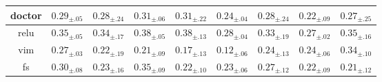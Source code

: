 \begin{table}
{\begin{tabular}{c|c|c|c|c|c|c|c|c|c}
		\multicolumn{2}{c|}{\gls{doctor}} & $0.29_{\pm .05}$ & $0.28_{\pm .24}$ & $0.31_{\pm .06}$ & $0.31_{\pm .22}$ & $0.24_{\pm .04}$ & $0.28_{\pm .24}$ & $0.22_{\pm .09}$ & $0.27_{\pm .25}$ \\\hline
		\multicolumn{2}{c|}{\gls{relu}} & $0.35_{\pm .05}$ & $0.34_{\pm .17}$ & $0.38_{\pm .05}$ & $0.38_{\pm .13}$ & $0.28_{\pm .04}$ & $0.33_{\pm .19}$ & $0.27_{\pm .02}$ & $0.35_{\pm .16}$ \\\hline
		\multicolumn{2}{c|}{\gls{vim}} & $0.27_{\pm .03}$ & $0.22_{\pm .19}$ & $0.21_{\pm .09}$ & $0.17_{\pm .13}$ & $0.12_{\pm .06}$ & $0.24_{\pm .13}$ & $0.24_{\pm .06}$ & $0.34_{\pm .10}$ \\\hline
		\multicolumn{2}{c|}{\gls{fs}} & $0.30_{\pm .08}$ & $0.23_{\pm .16}$ & $0.35_{\pm .09}$ & $0.22_{\pm .10}$ & $0.23_{\pm .06}$ & $0.27_{\pm .12}$ & $0.22_{\pm .09}$ & $0.21_{\pm .12}$ \\\hline
	\end{tabular}%
	}
\end{table}
